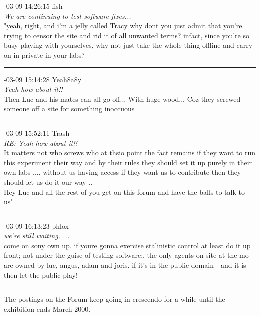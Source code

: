 \begin{mail}
{-03-09 14:26:15 fish}\\
{\itshape We are continuing to test software fixes...}\\
"yeah, right, and i'm a jelly called Tracy
why dont you just admit that you're trying to censor the site and rid it of all unwanted terms? infact, since you're so busy playing with yourselves, why not just take the whole thing offline and carry on in private in your labs?	\\

\rule{0.8\textwidth}{.4pt}

{-03-09 15:14:28 Yeah8a8y}\\
{\itshape Yeah how about it!!}\\
Then Luc and his mates can all go off... With huge wood... Coz they screwed someone off a site for something inoccuous\\


\rule{0.8\textwidth}{.4pt}


{-03-09 15:52:11 Trash}\\
{\itshape RE: Yeah how about it!!}\\
It matters not who screws who at thsio point the fact remains if they want to run this experiment their way and by their rules they should set it up purely in their own labs .... without us having access if they want us to contribute then they should let us do it our way ..\\
Hey Luc and all the rest of you get on this forum and have the balls to talk to us"\\

\rule{0.8\textwidth}{.4pt}

{-03-09 16:13:23 phlox}\\
{\itshape we're still waiting. . .}\\
come on sony own up. if youre gonna exercise stalinistic control at least do it up front; not under the guise of testing software;. the only agents on site at the mo are owned by luc, angus, adam and joris. if it's in the public domain - and it is -  then let the public play!

\rule{0.8\textwidth}{.4pt}
\end{mail}

The postings on the Forum keep going in crescendo for a while until the exhibition ends March 2000. 

